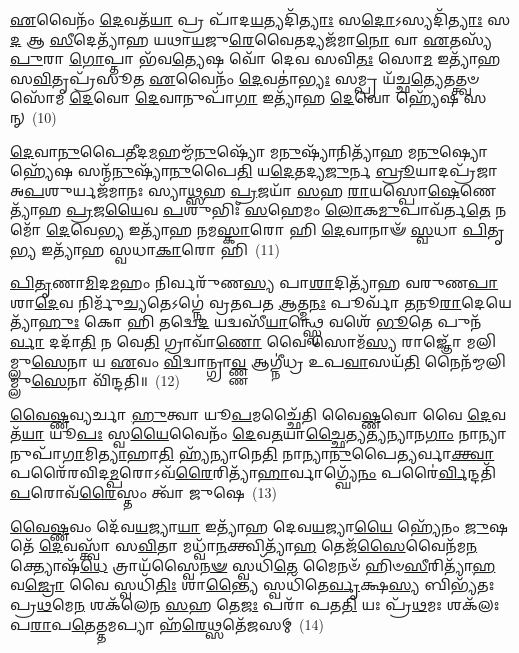 \-\ul{𑌏}\-𑌵𑍈𑌨𑌂᳴ \ul{𑌦𑍇}\-𑌵𑌤᳴\-\ul{𑌯𑌾} 𑌪𑍍𑌰 𑌪𑌾᳴𑌦\-\ul{𑌯}\-𑌤𑍍𑌯𑌦𑌿᳴\-\ul{𑌤𑍍𑌯𑌾𑌃} 𑌸\-\ul{𑌦𑍋}\-\-𑌽𑌸𑍍𑌯𑌦𑌿᳴\-\ul{𑌤𑍍𑌯𑌾𑌃} 𑌸\-\ul{𑌦} 𑌆 \ul{𑌸𑍀}\-𑌦𑍇𑌤𑍍𑌯𑌾᳴𑌹 𑌯𑌥𑌾\-\ul{𑌯}\-𑌜𑍁\-\ul{𑌰𑍇}\-𑌵𑍈𑌤𑌦𑍍𑌯𑌜᳴𑌮𑌾\-\ul{𑌨𑍋} 𑌵𑌾 \ul{𑌏}\-𑌤𑌸𑍍𑌯᳴ \ul{𑌪𑍁}\-𑌰𑌾 \ul{𑌗𑍋}\-𑌪𑍍𑌤𑌾 𑌭᳴𑌵\-\ul{𑌤𑍍𑌯𑍇}\-𑌷 𑌵𑍋᳴ 𑌦𑍇𑌵 𑌸𑌵𑌿\-\ul{𑌤𑌃} 𑌸𑍋\-\ul{𑌮} 𑌇𑌤𑍍𑌯𑌾᳴𑌹 𑌸\-\ul{𑌵𑌿}\-𑌤𑍃𑌪𑍍𑌰᳴𑌸𑍂𑌤 \ul{𑌏}\-𑌵𑍈𑌨𑌂᳴ \ul{𑌦𑍇}\-𑌵𑌤𑌾॑\-\ul{𑌭𑍍𑌯𑌃} 𑌸𑌮𑍍𑌪𑍍𑌰 𑌯᳴𑌚𑍍𑌛\-\ul{𑌤𑍍𑌯𑍇}\-𑌤𑌤𑍍𑌤𑍍𑌵𑍞 𑌸𑍋᳴𑌮 \ul{𑌦𑍇}\-𑌵𑍋 \ul{𑌦𑍇}\-𑌵𑌾𑌨𑍁𑌪𑌾᳴\-\ul{𑌗𑌾} 𑌇𑌤𑍍𑌯𑌾᳴𑌹 \ul{𑌦𑍇}\-𑌵𑍋 𑌹𑍍𑌯𑍇᳴𑌷 𑌸𑌨𑍍~(10)

\-\ul{𑌦𑍇}\-𑌵𑌾\-\ul{𑌨𑍁}\-𑌪𑍈\-\ul{𑌤𑍀}\-𑌦\-\ul{𑌮}\-𑌹𑌮𑍍𑌮᳴\-\ul{𑌨𑍁}\-𑌷𑍍𑌯𑍋᳴ 𑌮\-\ul{𑌨𑍁}\-𑌷𑍍𑌯𑌾᳴𑌨𑌿𑌤𑍍𑌯𑌾᳴𑌹 𑌮\-\ul{𑌨𑍁}\-𑌷𑍍𑌯𑍋  𑌹𑍍𑌯𑍇᳴𑌷 𑌸𑌨𑍍𑌮᳴\-\ul{𑌨𑍁}\-𑌷𑍍𑌯𑌾᳴\-\ul{𑌨𑍁}\-𑌪𑍈\-\ul{𑌤𑌿} 𑌯\-\ul{𑌦𑍇}\-𑌤𑌦𑍍𑌯\-\ul{𑌜𑍁}\-𑌰𑍍𑌨 \ul{𑌬𑍍𑌰𑍂}\-𑌯𑌾𑌦𑌪𑍍𑌰᳴𑌜𑌾 𑌅\-\ul{𑌪}\-𑌶𑍁𑌰𑍍𑌯𑌜᳴𑌮𑌾𑌨𑌃 𑌸𑍍𑌯𑌾\-\ul{𑌥𑍍𑌸}\-𑌹 \ul{𑌪𑍍𑌰}\-𑌜𑌯𑌾᳴ \ul{𑌸}\-𑌹 \ul{𑌰𑌾}\-𑌯𑌸𑍍𑌪𑍋\-\ul{𑌷𑍇}\-𑌣𑍇𑌤𑍍𑌯𑌾᳴𑌹 \ul{𑌪𑍍𑌰}\-𑌜\-\ul{𑌯𑍈}\-𑌵 \ul{𑌪}\-𑌶𑍁𑌭𑌿𑌃᳴ \ul{𑌸}\-𑌹𑍇𑌮𑌂 \ul{𑌲𑍋}\-𑌕\-\ul{𑌮𑍁}\-𑌪𑌾𑌵᳴𑌰𑍍𑌤\-\ul{𑌤𑍇} 𑌨𑌮𑍋᳴ \ul{𑌦𑍇}\-𑌵𑍇\-\ul{𑌭𑍍𑌯} 𑌇𑌤𑍍𑌯𑌾᳴𑌹 𑌨𑌮\-\ul{𑌸𑍍𑌕𑌾}\-𑌰𑍋 𑌹𑌿 \ul{𑌦𑍇}\-𑌵𑌾𑌨𑌾𑍟᳴ \ul{𑌸𑍍𑌵}\-𑌧𑌾 \ul{𑌪𑌿}\-𑌤𑍃\-\ul{𑌭𑍍𑌯} 𑌇𑌤𑍍𑌯𑌾᳴𑌹 𑌸𑍍𑌵𑌧𑌾\-\ul{𑌕𑌾}\-𑌰𑍋 𑌹𑌿~(11)

\-\ul{𑌪𑌿}\-\-\ul{𑌤𑍃}\-𑌣𑌾\-\ul{𑌮𑌿}\-𑌦\-\ul{𑌮}\-𑌹𑌂 𑌨𑌿𑌰𑍍𑌵𑌰𑍁᳴𑌣\-\ul{𑌸𑍍𑌯} 𑌪𑌾\-\ul{𑌶𑌾}\-𑌦𑌿𑌤𑍍𑌯𑌾᳴𑌹 𑌵𑌰𑍁𑌣\-\ul{𑌪𑌾}\-𑌶𑌾\-\ul{𑌦𑍇}\-𑌵 𑌨𑌿𑌰𑍍𑌮𑍁᳴\-\ul{𑌚𑍍𑌯}\-𑌤𑍇\-𑌽𑌗𑍍𑌨𑍇॑ 𑌵𑍍𑌰𑌤𑌪𑌤 \ul{𑌆}\-𑌤𑍍𑌮\-\ul{𑌨𑌃} 𑌪𑍂𑌰𑍍𑌵𑌾᳴ \ul{𑌤}\-𑌨𑍂\-\ul{𑌰𑌾}\-𑌦𑍇𑌯𑍇𑌤𑍍𑌯𑌾᳴\-\ul{𑌹𑍁𑌃} 𑌕𑍋 𑌹𑌿 𑌤𑌦𑍍𑌵𑍇\-\ul{𑌦} 𑌯𑌦𑍍𑌵𑌸𑍀᳴\-\ul{𑌯𑌾}\-𑌨𑍍𑌥𑍍𑌸𑍍𑌵𑍇 𑌵𑌶𑍇᳴ \ul{𑌭𑍂}\-𑌤𑍇 𑌪𑍁𑌨᳴\-\ul{𑌰𑍍𑌵𑌾} 𑌦𑌦𑌾᳴\-\ul{𑌤𑌿} 𑌨 𑌵𑍇\-\ul{𑌤𑌿} 𑌗𑍍𑌰𑌾𑌵𑌾᳴\-\ul{𑌣𑍋} 𑌵𑍈 𑌸𑍋𑌮᳴\-\ul{𑌸𑍍𑌯} 𑌰𑌾𑌜𑍍𑌞𑍋᳴ 𑌮𑌲𑌿𑌮𑍍𑌲𑍁\-\ul{𑌸𑍇}\-𑌨𑌾 𑌯 \ul{𑌏}\-𑌵𑌂 \ul{𑌵𑌿}\-𑌦𑍍𑌵𑌾𑌨𑍍𑌗𑍍𑌰𑌾\-\ul{𑌵𑍍𑌣𑍍𑌣} 𑌆𑌗𑍍𑌨𑍀॑𑌧𑍍𑌰 𑌉𑌪\-\ul{𑌵𑌾}\-𑌸𑌯᳴\-\ul{𑌤𑌿} 𑌨𑍈𑌨᳴𑌮𑍍𑌮𑌲𑌿𑌮𑍍𑌲𑍁\-\ul{𑌸𑍇}\-𑌨𑌾 𑌵𑌿᳴𑌨𑍍𑌦𑌤𑌿॥~(12)

{\anuvakamend[{𑌅𑌥᳴ 𑌦𑌦\-\ul{𑌤𑍇} 𑌸𑍍𑌵\-\ul{𑌯𑌾} 𑌸𑌨𑍍𑌥𑍍𑌸𑍍𑌵᳴𑌧𑌾\-\ul{𑌕𑌾}\-𑌰𑍋 𑌹𑌿 𑌵𑌿᳴𑌨𑍍𑌦𑌤𑌿}]}%

\-\ul{𑌵𑍈}\-\-\ul{𑌷𑍍𑌣}\-𑌵𑍍𑌯𑌰𑍍𑌚𑌾 \ul{𑌹𑍁}\-𑌤𑍍𑌵𑌾 𑌯𑍂\-\ul{𑌪}\-𑌮𑌚𑍍𑌛𑍈᳴𑌤𑌿 𑌵𑍈\-\ul{𑌷𑍍𑌣}\-𑌵𑍋 𑌵𑍈 \ul{𑌦𑍇}\-𑌵𑌤᳴\-\ul{𑌯𑌾} 𑌯𑍂\-\ul{𑌪𑌃} 𑌸𑍍𑌵\-\ul{𑌯𑍈}\-𑌵𑍈𑌨𑌂᳴ \ul{𑌦𑍇}\-𑌵\-\ul{𑌤}\-𑌯𑌾\-\ul{𑌚𑍍𑌛𑍈}\-𑌤𑍍𑌯\-\ul{𑌤𑍍𑌯}\-𑌨𑍍𑌯𑌾𑌨\-\ul{𑌗𑌾𑌂} 𑌨𑌾𑌨𑍍𑌯𑌾𑌨𑍁𑌪𑌾᳴\-\ul{𑌗𑌾}\-𑌮𑌿\-\ul{𑌤𑍍𑌯𑌾}\-𑌹𑌾\-\ul{𑌤𑌿} 𑌹𑍍𑌯᳴𑌨𑍍𑌯𑌾𑌨𑍇\-\ul{𑌤𑌿} 𑌨𑌾𑌨𑍍𑌯𑌾\-\ul{𑌨𑍁}\-𑌪𑍈\-\ul{𑌤𑍍𑌯}\-𑌰𑍍𑌵𑌾\-\ul{𑌕𑍍𑌤𑍍𑌵𑌾} 𑌪𑌰𑍈᳴𑌰𑌵𑌿𑌦\-\ul{𑌮𑍍𑌪}\-𑌰𑍋\-𑌽𑌵᳴\-\ul{𑌰𑍈}\-𑌰𑌿𑌤𑍍𑌯𑌾᳴\-\ul{𑌹𑌾}\-𑌰𑍍𑌵𑌾𑌗𑍍𑌘𑍍𑌯𑍇᳴\-\ul{𑌨𑌂} 𑌪𑌰𑍈॑\-\ul{𑌰𑍍𑌵𑌿}\-𑌨𑍍𑌦𑌤𑌿᳴ \ul{𑌪}\-𑌰𑍋𑌵᳴\-\ul{𑌰𑍈}\-𑌸𑍍𑌤𑌂 𑌤𑍍𑌵𑌾᳴ 𑌜𑍁𑌷𑍇~(13)

\-\ul{𑌵𑍈}\-\-\ul{𑌷𑍍𑌣}\-𑌵𑌂 𑌦𑍇᳴𑌵\-\ul{𑌯}\-𑌜𑍍𑌯𑌾\-\ul{𑌯𑌾} 𑌇𑌤𑍍𑌯𑌾᳴𑌹 𑌦𑍇𑌵\-\ul{𑌯}\-𑌜𑍍𑌯𑌾\-\ul{𑌯𑍈} 𑌹𑍍𑌯𑍇᳴𑌨𑌂 \ul{𑌜𑍁}\-𑌷𑌤𑍇᳴ \ul{𑌦𑍇}\-𑌵𑌸𑍍𑌤𑍍𑌵𑌾᳴ 𑌸\-\ul{𑌵𑌿}\-𑌤𑌾 𑌮𑌧𑍍𑌵𑌾᳴\-\ul{𑌨}\-𑌕𑍍𑌤𑍍𑌵𑌿𑌤𑍍𑌯𑌾᳴\-\ul{𑌹} 𑌤𑍇𑌜᳴\-\ul{𑌸𑍈}\-𑌵𑍈𑌨᳴𑌮\-\ul{𑌨}\-𑌕𑍍𑌤𑍍𑌯𑍋𑌷᳴\-\ul{𑌧𑍇} 𑌤𑍍𑌰𑌾𑌯᳴𑌸𑍍𑌵𑍈\-\ul{𑌨}\-\-\ul{𑍟} 𑌸𑍍𑌵𑌧𑌿᳴\-\ul{𑌤𑍇} 𑌮𑍈𑌨𑍞᳴ 𑌹𑌿𑍞\-\ul{𑌸𑍀}\-𑌰𑌿𑌤𑍍𑌯𑌾᳴\-\ul{𑌹} 𑌵\-\ul{𑌜𑍍𑌰𑍋} 𑌵𑍈 𑌸𑍍𑌵𑌧𑌿᳴\-\ul{𑌤𑌿𑌃} 𑌶𑌾\-\ul{𑌨𑍍𑌤𑍍𑌯𑍈} 𑌸𑍍𑌵𑌧𑌿᳴𑌤𑍇\-\ul{𑌰𑍍𑌵𑍃}\-𑌕𑍍𑌷\-\ul{𑌸𑍍𑌯} 𑌬𑌿𑌭𑍍𑌯᳴𑌤𑌃 𑌪𑍍𑌰\-\ul{𑌥}\-𑌮𑍇\-\ul{𑌨} 𑌶𑌕᳴𑌲𑍇𑌨 \ul{𑌸}\-𑌹 𑌤𑍇\-\ul{𑌜𑌃} 𑌪𑌰𑌾᳴ 𑌪𑌤\-\ul{𑌤𑌿} 𑌯𑌃 𑌪𑍍𑌰᳴\-\ul{𑌥}\-𑌮𑌃 𑌶𑌕᳴𑌲𑌃 𑌪\-\ul{𑌰𑌾}\-𑌪\-\ul{𑌤𑍇}\-𑌤𑍍𑌤𑌮𑌪𑍍𑌯𑌾 𑌹᳴\-\ul{𑌰𑍇}\-𑌥𑍍𑌸𑌤𑍇᳴𑌜𑌸𑌮𑍍~(14)

